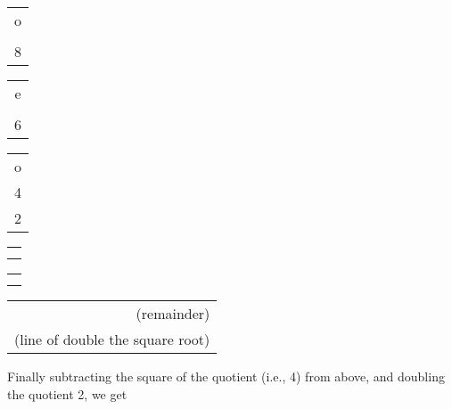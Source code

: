 \documentclass[10pt, openany]{book}
\begin{document}
{{{{{{{{{{{{{{{{{{{{\begin{sloppypar}
{\hspace{1cm} \begin{tabular}{c} o\\ \\ 8  \end{tabular}
\begin{tabular}{c} e\\ \\6  \end{tabular}
\begin{tabular}{c} o\\4\\2  \end{tabular} \begin{tabular}{c} \\ \\ \\ \end{tabular} \begin{tabular}{c} \\ \\ \\ \end{tabular} \hspace{10mm} \begin{tabular}{r} \\ (remainder)\\ (line of double the square root)\\  \end{tabular}
\vspace{3mm}

Finally subtracting the square of the quotient (i.e., 4) from above,
and doubling the quotient 2, we get
\vspace{3mm}

}
\end{sloppypar}}}}}}}}}}}}}}}}}}}}}
\end{document}
